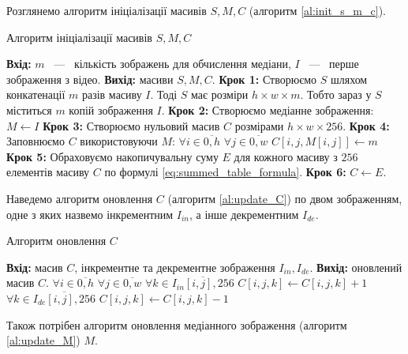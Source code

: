 Розглянемо алгоритм ініціалізації масивів $S, M, C$ (алгоритм \ref{al:init_s_m_c}).
\begin{algorithm}[H]
    \caption{Алгоритм ініціалізації масивів $S, M, C$}
    \label{al:init_s_m_c}
    \begin{algorithmic}
        \State \textbf{Вхід:} $m$ ~---~ кількість зображень для обчислення медіани,
        $I$ ~---~ перше зображення з відео.
        \State \textbf{Вихід:} масиви $S, M, C$.
        \State \textbf{Крок 1:} Створюємо $S$ шляхом конкатенації $m$ разів масиву $I$.
        Тоді $S$ має розміри $h \times w \times m$. Тобто зараз у $S$ міститься
        $m$ копій зображення $I$.
        \State \textbf{Крок 2:} Створюємо медіанне зображення: $M \gets I$
        \State \textbf{Крок 3:} Створюємо нульовий масив $C$ розмірами $h \times w \times 256$.
        \State \textbf{Крок 4:} Заповнюємо $C$ використовуючи $M$:
        \State $\forall i \in \overline{0,h}$
        \State \qquad $\forall j \in \overline{0,w}$
        \State \qquad \qquad $C[i,j,M[i,j]] \gets m$
        \State \textbf{Крок 5:} Обраховуємо накопичувальну суму $E$ для кожного масиву з $256$ елементів
        масиву $C$ по формулі \eqref{eq:summed_table_formula}.
        \State \textbf{Крок 6:} $C \gets E$.
    \end{algorithmic}
\end{algorithm}

Наведемо алгоритм оновлення $C$ (алгоритм \ref{al:update_C}) по двом зображенням,
одне з яких назвемо інкрементним $I_{in}$, а інше декрементним $I_{de}$.

\begin{algorithm}[H]
    \caption{Алгоритм оновлення $C$}
    \label{al:update_C}
    \begin{algorithmic}
        \State \textbf{Вхід:} масив $C$, інкрементне та декрементне зображення $I_{in}, I_{de}$.
        \State \textbf{Вихід:} оновлений масив $C$.
        \State $\forall i \in \overline{0,h}$
        \State \qquad  $\forall j \in \overline{0,w}$
        \State \qquad \qquad $\forall k \in \overline{I_{in}[i,j],256}$
        \State \qquad \qquad \qquad $C[i,j,k] \gets C[i,j,k] + 1$
        \State \qquad \qquad $\forall k \in \overline{I_{de}[i,j],256}$
        \State \qquad \qquad \qquad $C[i,j,k] \gets C[i,j,k] - 1$
    \end{algorithmic}
\end{algorithm}

Також потрібен алгоритм оновлення медіанного зображення (алгоритм \ref{al:update_M}) $M$.

